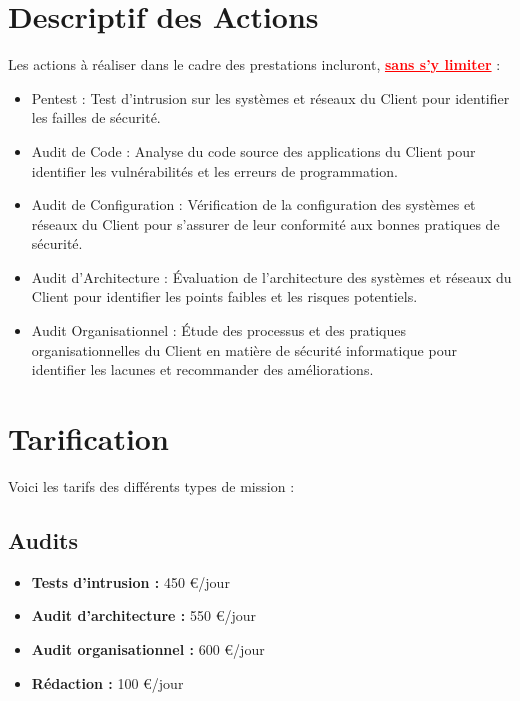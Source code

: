 \documentclass[12pt]{extarticle}
\begin{document}
\section{Descriptif des Actions}
Les actions à réaliser dans le cadre des prestations incluront, \textcolor{red}{\textbf{\underline{sans s'y limiter}}} :
\begin{itemize}
    \item Pentest : Test d'intrusion sur les systèmes et réseaux du Client pour identifier les failles de sécurité.
    \item Audit de Code : Analyse du code source des applications du Client pour identifier les vulnérabilités et les erreurs de programmation.
    \item Audit de Configuration : Vérification de la configuration des systèmes et réseaux du Client pour s'assurer de leur conformité aux bonnes pratiques de sécurité.
    \item Audit d'Architecture : Évaluation de l'architecture des systèmes et réseaux du Client pour identifier les points faibles et les risques potentiels.
    \item Audit Organisationnel : Étude des processus et des pratiques organisationnelles du Client en matière de sécurité informatique pour identifier les lacunes et recommander des améliorations.
\end{itemize}
\newpage
\section{Tarification}
Voici les tarifs des différents types de mission :
\subsection{Audits}
\begin{itemize}
    \item \textbf{Tests d'intrusion :} 450 €/jour
    \item \textbf{Audit d'architecture :} 550 €/jour
    \item \textbf{Audit organisationnel :} 600 €/jour
    \item \textbf{Rédaction :} 100 €/jour
\end{itemize}
\end{document}
